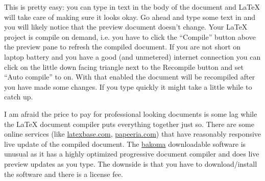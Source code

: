 This is pretty easy: you can type in text in the body of the document and \LaTeX{} will take care of making sure it looks okay. Go ahead and type some text in and you will likely notice that the preview document doesn't change. Your \LaTeX{} project is compile on demand, i.e. you have to click the ``Compile'' button above the preview pane to refresh the compiled document. If you are not short on laptop battery and you have a good (and unmetered) internet connection you can click on the little down facing triangle next to the Recompile button and set ``Auto compile'' to on. With that enabled the document will be recompiled after you have made some changes. If you type quickly it might take a little while to catch up. 

I am afraid the price to pay for professional looking documents is some lag while the \LaTeX{} document compiler puts everything together just so. There are some online services (like \href{https://latexbase.com}{latexbase.com}, \href{https://www.papeeria.com}{papeeria.com}) that have reasonably responsive live update of the compiled document. The \href{http://www.bakoma-tex.com/menu/about.php}{bakoma} downloadable software is unusual as it has a highly optimized progressive document compiler and does live preview updates as you type. The downside is that you have to download/install the software and there is a license fee.

